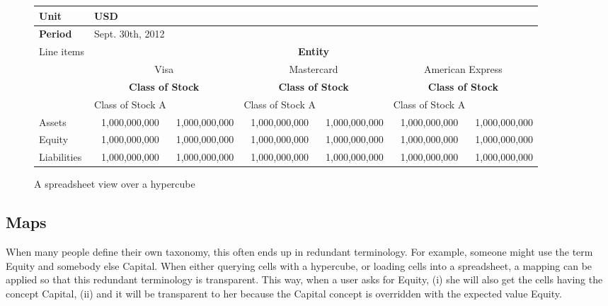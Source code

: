 \documentclass{vldb}
\begin{document}
\begin{figure*}
\caption{A spreadsheet view over a hypercube}
\label{fig-spreadsheet}

\begin{tabular}{|l||c|c|c|c|c|c|}
\hline
\textbf{Unit} & \multicolumn{6}{|l|}{USD} \\
\hline
\textbf{Period} & \multicolumn{6}{|l|}{Sept. 30th, 2012 } \\
\hline
\hline
\multirow{4}{*}{Line items} & \multicolumn{6}{|c|}{\textbf{Entity}} \\
\cline{2-7}

& \multicolumn{2}{|c|}{Visa} & \multicolumn{2}{|c|}{Mastercard} & \multicolumn{2}{|c|}{American Express} \\
\cline{2-7}

& \multicolumn{2}{|c|}{\textbf{Class of Stock}} & \multicolumn{2}{|c|}{\textbf{Class of Stock}} & \multicolumn{2}{|c|}{\textbf{Class of Stock}} \\
\cline{2-2}\cline{4-4}\cline{6-6}

& Class of Stock A & & Class of Stock A &  & Class of Stock A & \\
\hline
\hline

Assets & 1,000,000,000 & 1,000,000,000 & 1,000,000,000 & 1,000,000,000 & 1,000,000,000 & 1,000,000,000 \\
\hline

Equity & 1,000,000,000 & 1,000,000,000 & 1,000,000,000 & 1,000,000,000 & 1,000,000,000 & 1,000,000,000 \\
\hline

Liabilities & 1,000,000,000 & 1,000,000,000 & 1,000,000,000 & 1,000,000,000 & 1,000,000,000 & 1,000,000,000 \\
\hline
\end{tabular}
\end{figure*}

\subsection{Maps}

When many people define their own taxonomy, this often ends up in redundant terminology. For example, someone might use the term Equity and somebody else Capital. When either querying cells with a hypercube, or loading cells into a spreadsheet, a mapping can be applied so that this redundant terminology is transparent. This way, when a user asks for Equity, (i) she will also get the cells having the concept Capital, (ii) and it will be transparent to her because the Capital concept is overridden with the expected value Equity.
\end{document}
